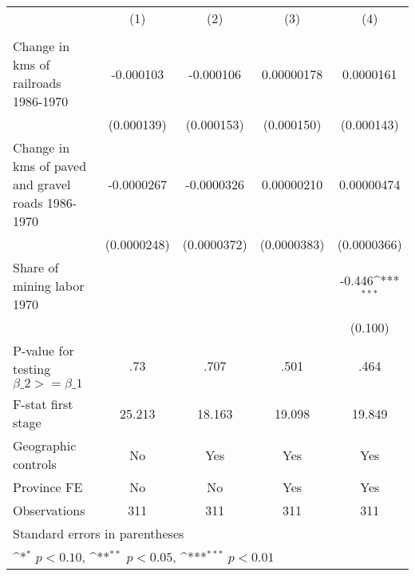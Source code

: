 {
\def\sym#1{\ifmmode^{#1}\else\(^{#1}\)\fi}
\begin{tabular}{l*{4}{c}}
\hline\hline
                &\multicolumn{1}{c}{(1)}&\multicolumn{1}{c}{(2)}&\multicolumn{1}{c}{(3)}&\multicolumn{1}{c}{(4)}\\
                &\multicolumn{1}{c}{}&\multicolumn{1}{c}{}&\multicolumn{1}{c}{}&\multicolumn{1}{c}{}\\
\hline
Change in kms of railroads 1986-1970&-0.000103         &-0.000106         &0.00000178         &0.0000161         \\
                &(0.000139)         &(0.000153)         &(0.000150)         &(0.000143)         \\
[1em]
Change in kms of paved and gravel roads 1986-1970&-0.0000267         &-0.0000326         &0.00000210         &0.00000474         \\
                &(0.0000248)         &(0.0000372)         &(0.0000383)         &(0.0000366)         \\
[1em]
Share of mining labor 1970&                  &                  &                  &   -0.446\sym{***}\\
                &                  &                  &                  &  (0.100)         \\
\hline
P-value for testing $\beta\_{2} >= \beta\_{1}$&      .73         &     .707         &     .501         &     .464         \\
F-stat first stage&   25.213         &   18.163         &   19.098         &   19.849         \\
Geographic controls&       No         &      Yes         &      Yes         &      Yes         \\
Province FE     &       No         &       No         &      Yes         &      Yes         \\
Observations    &      311         &      311         &      311         &      311         \\
\hline\hline
\multicolumn{5}{l}{\footnotesize Standard errors in parentheses}\\
\multicolumn{5}{l}{\footnotesize \sym{*} \(p<0.10\), \sym{**} \(p<0.05\), \sym{***} \(p<0.01\)}\\
\end{tabular}
}
